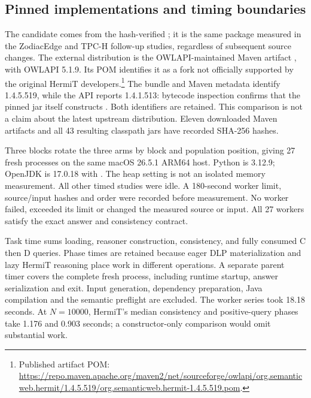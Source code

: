 \subsection{Pinned implementations and timing boundaries}
The candidate comes from the hash-verified
; it is the same package measured in
the ZodiacEdge and TPC-H follow-up studies, regardless of subsequent source
changes. The external distribution is the OWLAPI-maintained Maven artifact
, with OWLAPI
5.1.9. Its POM identifies it as a fork not officially supported by the original
HermiT developers.\footnote{Published artifact POM:
\url{https://repo.maven.apache.org/maven2/net/sourceforge/owlapi/org.semanticweb.hermit/1.4.5.519/org.semanticweb.hermit-1.4.5.519.pom}.}
The bundle and Maven metadata identify 1.4.5.519, while the API reports
1.4.1.513: bytecode inspection confirms that the pinned jar itself constructs
. Both identifiers are retained. This comparison is
not a claim about the latest upstream distribution. Eleven downloaded Maven
artifacts and all 43 resulting classpath jars have recorded SHA-256 hashes.

Three blocks rotate the three arms by block and population position, giving
27 fresh processes on the same macOS 26.5.1 ARM64 host. Python is 3.12.9;
OpenJDK is 17.0.18 with . The heap setting is not an
isolated memory measurement. All other timed studies were idle. A 180-second
worker limit, source/input hashes and order were recorded before measurement.
No worker failed, exceeded its limit or changed the measured source or input.
All 27 workers satisfy the exact answer and consistency contract.

Task time sums loading, reasoner construction, consistency, and fully consumed
C then D queries. Phase times are retained because eager DLP materialization
and lazy HermiT reasoning place work in different operations. A separate
parent timer covers the complete fresh process, including runtime startup,
answer serialization and exit. Input generation, dependency preparation,
Java compilation and the semantic preflight are excluded. The worker series
took 18.18 seconds. At $N=10000$, HermiT's median consistency and positive-query
phases take 1.176 and 0.903 seconds; a constructor-only comparison would omit
substantial work.




